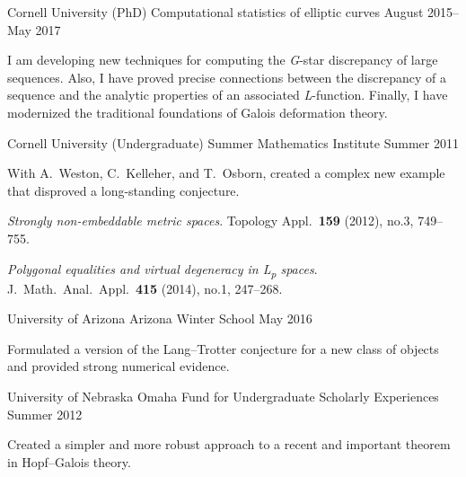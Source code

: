 \documentclass[11pt, letterpaper]{awesome-cv}
\begin{document}

\begin{cventries}

\cventry
	{Cornell University (PhD)}
	{Computational statistics of elliptic curves}
	{}
	{August 2015--May 2017}
	{
		\begin{cvitems}
			\item{I am developing new techniques for computing the \emph{G}-star discrepancy of large sequences. Also, I have proved precise connections between the discrepancy of a sequence and the analytic properties of an associated \emph{L}-function. Finally, I have modernized the traditional foundations of Galois deformation theory.}
		\end{cvitems}
	}
	
\cventry
	{Cornell University (Undergraduate)}
	{Summer Mathematics Institute}
	{}
	{Summer 2011}
	{
		\begin{cvitems}
			\item{With A.~Weston, C.~Kelleher, and T.~Osborn, created a complex new example that disproved a long-standing conjecture.}
			\item{\emph{Strongly non-embeddable metric spaces}. Topology Appl.~\textbf{159} (2012), no.3, 749--755.}
			\item{\emph{Polygonal equalities and virtual degeneracy in L\textsubscript{p} spaces}. J.~Math.~Anal.~Appl.~\textbf{415} (2014), no.1, 247--268.}
		\end{cvitems}
	}
	
\cventry
	{University of Arizona}
	{Arizona Winter School}
	{}
	{May 2016}
	{
		\begin{cvitems}
			\item{Formulated a version of the Lang--Trotter conjecture for a new class of objects and provided strong numerical evidence.}
		\end{cvitems}
	}

\cventry
	{University of Nebraska Omaha}
	{Fund for Undergraduate Scholarly Experiences}
	{}
	{Summer 2012}
	{
		\begin{cvitems}
			\item{Created a simpler and more robust approach to a recent and important theorem in Hopf--Galois theory.}
		\end{cvitems}
	}
	
\end{cventries}





\end{document}
